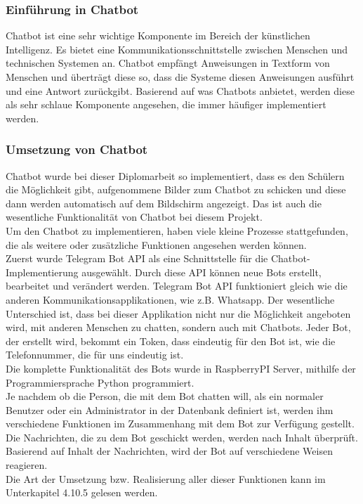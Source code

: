 \subsubsection{Einführung in Chatbot}
Chatbot ist eine sehr wichtige Komponente im Bereich der künstlichen Intelligenz. Es bietet eine Kommunikationsschnittstelle zwischen Menschen und technischen Systemen an. Chatbot empfängt Anweisungen in Textform von Menschen und überträgt diese so, dass die Systeme diesen Anweisungen ausführt und eine Antwort zurückgibt. Basierend auf was Chatbots anbietet, werden diese als sehr schlaue Komponente angesehen, die immer häufiger implementiert werden.
\subsubsection{Umsetzung von Chatbot}
Chatbot wurde bei dieser Diplomarbeit so implementiert, dass es den Schülern die Möglichkeit gibt, aufgenommene Bilder zum Chatbot zu schicken und diese dann werden automatisch auf dem Bildschirm angezeigt. Das ist auch die wesentliche Funktionalität von Chatbot bei diesem Projekt. \\
Um den Chatbot zu implementieren, haben viele kleine Prozesse stattgefunden, die als weitere oder zusätzliche Funktionen angesehen werden können.\\
Zuerst wurde Telegram Bot API als eine Schnittstelle für die Chatbot-Implementierung ausgewählt. Durch diese API können neue Bots erstellt, bearbeitet und verändert werden. Telegram Bot API funktioniert gleich wie die anderen Kommunikationsapplikationen, wie z.B. Whatsapp. Der wesentliche Unterschied ist, dass bei dieser Applikation nicht nur die Möglichkeit angeboten wird, mit anderen Menschen zu chatten, sondern auch mit Chatbots. Jeder Bot, der erstellt wird, bekommt ein Token, dass eindeutig für den Bot ist, wie die Telefonnummer, die für uns eindeutig ist. \\
Die komplette Funktionalität des Bots wurde in RaspberryPI Server, mithilfe der Programmiersprache Python programmiert. \\
Je nachdem ob die Person, die mit dem Bot chatten will, als ein normaler Benutzer oder ein Administrator in der Datenbank definiert ist, werden ihm verschiedene Funktionen im Zusammenhang mit dem Bot zur Verfügung gestellt. Die Nachrichten, die zu dem Bot geschickt werden, werden nach Inhalt überprüft. Basierend auf Inhalt der Nachrichten, wird der Bot auf verschiedene Weisen reagieren.\\
Die Art der Umsetzung bzw. Realisierung aller dieser Funktionen kann im Unterkapitel 4.10.5 gelesen werden.   

